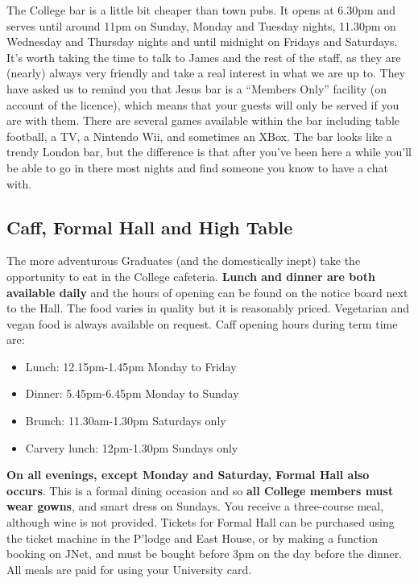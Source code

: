 \documentclass[11pt,fleqn, oneside]{book} %
\begin{document}
The College bar is a little bit cheaper than town pubs. It opens at 6.30pm and serves until around 11pm on Sunday, Monday and Tuesday nights, 11.30pm on Wednesday and Thursday nights and until midnight on Fridays and Saturdays.  It’s worth taking the time to talk to James and the rest of the staff, as they are (nearly) always very friendly and take a real interest in what we are up to. They have asked us to remind you that Jesus bar is a “Members Only” facility (on account of the licence), which means that your guests will only be served if you are with them. There are several games available within the bar including table football, a TV, a Nintendo Wii, and sometimes an XBox. The bar looks like a trendy London bar, but the difference is that after you’ve been here a while you’ll be able to go in there most nights and find someone you know to have a chat with. 

\subsection{Caff, Formal Hall and High Table}

The more adventurous Graduates (and the domestically inept) take the opportunity to eat in the College cafeteria. \textbf{Lunch and dinner are both available daily} and the hours of opening can be found on the notice board next to the Hall. The food varies in quality but it is reasonably priced. Vegetarian and vegan food is always available on request. Caff opening hours during term time are: 
\begin{itemize}
\item Lunch: 		12.15pm-1.45pm		Monday to Friday
\item Dinner:		5.45pm-6.45pm 		Monday to Sunday 
\item Brunch: 	11.30am-1.30pm 		Saturdays only
\item Carvery lunch: 	12pm-1.30pm 			Sundays only
\end{itemize}


\textbf{On all evenings, except Monday and Saturday, Formal Hall also occurs}. This is a formal dining occasion and so \textbf{all College members must wear gowns}, and smart dress on Sundays. You receive a three-course meal, although wine is not provided. Tickets for Formal Hall can be purchased using the ticket machine in the P’lodge and East House, or by making a function booking on JNet, and must be bought before 3pm on the day before the dinner. All meals are paid for using your University card.
\end{document}
